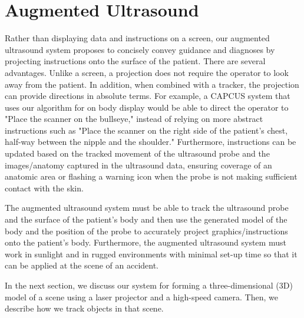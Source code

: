 \documentclass{llncs}
\begin{document}
\section{Augmented Ultrasound}
Rather than displaying data and instructions on a screen, our augmented ultrasound system proposes to concisely convey guidance and diagnoses by projecting instructions onto the surface of the patient. There are several advantages. Unlike a screen, a projection does not require the operator to look away from the patient. In addition, when combined with a tracker, the projection can provide directions in absolute terms. For example, a CAPCUS system that uses our algorithm for on body display would be able to direct the operator to "Place the scanner on the bullseye," instead of relying on more abstract instructions such as "Place the scanner on the right side of the patient's chest, half-way between the nipple and the shoulder." Furthermore, instructions can be updated based on the tracked movement of the ultrasound probe and the images/anatomy captured in the ultrasound data, ensuring coverage of an anatomic area or flashing a warning icon when the probe is not making sufficient contact with the skin.

The augmented ultrasound system must be able to track the ultrasound probe and the surface of the patient's body and then use the generated model of the body and the position of the probe to accurately project graphics/instructions onto the patient's body.  Furthermore, the augmented ultrasound system must work in sunlight and in rugged environments with minimal set-up time so that it can be applied at the scene of an accident.  

In the next section, we discuss our system for forming a three-dimensional (3D) model of a scene using a laser projector and a high-speed camera. Then, we describe how we track objects in that scene.
\end{document}
